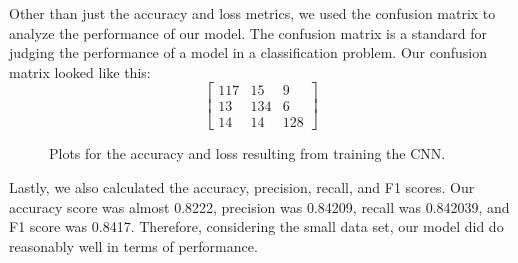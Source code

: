 \documentclass[11pt]{article}
\begin{document}
  Other than just the accuracy and loss metrics, we used the confusion matrix to 
  analyze the performance of our model. The confusion matrix is a standard for
  judging the performance of a model in a classification problem. Our confusion 
  matrix looked like this:
  \[\begin{bmatrix}
    117 & 15 & 9 \\
    13 & 134 & 6 \\
    14 & 14 & 128
 \end{bmatrix}\]
 \vspace{-2 em}
 \begin{center}
      \begin{figure}[h!]
    \centering
    \qquad
   \caption{Plots for the accuracy and loss resulting from training the CNN.}%
   \label{fig:results}
\end{figure}
\end{center}
\vspace{-2 em}
Lastly, we also calculated the accuracy, precision, recall, and F1 scores. Our accuracy score was almost
0.8222, precision was 0.84209, recall was 0.842039, and F1 score was 0.8417. Therefore, 
considering the small data set, our model did do reasonably well in terms of performance.
\end{document}
